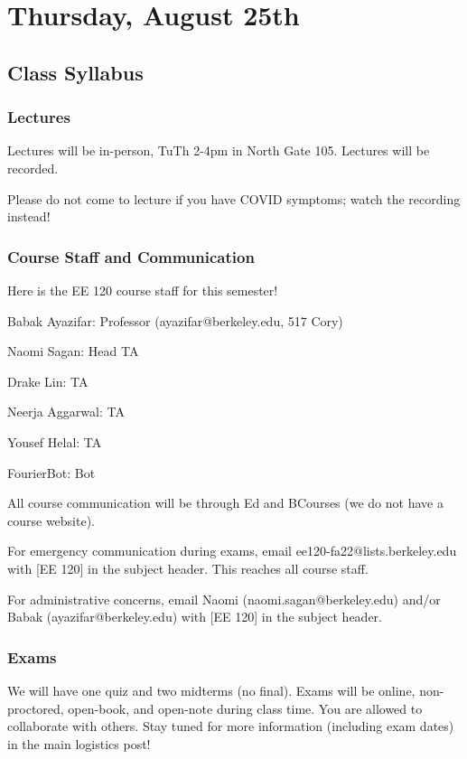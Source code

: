 \section{Thursday, August 25th}
\subsection{Class Syllabus}

\subsubsection{Lectures}
Lectures will be in-person, TuTh 2-4pm in North Gate 105. Lectures will be recorded.

Please do not come to lecture if you have COVID symptoms; watch the recording instead!

\subsubsection{Course Staff and Communication}

Here is the EE 120 course staff for this semester!

Babak Ayazifar: Professor (ayazifar@berkeley.edu, 517 Cory)

Naomi Sagan: Head TA

Drake Lin: TA

Neerja Aggarwal: TA

Yousef Helal: TA

FourierBot: Bot

All course communication will be through Ed and BCourses (we do not have a course website).

For emergency communication during exams, email ee120-fa22@lists.berkeley.edu with [EE 120] in the subject header. This reaches all course staff.

For administrative concerns, email Naomi (naomi.sagan@berkeley.edu) and/or Babak (ayazifar@berkeley.edu) with [EE 120] in the subject header.

\subsubsection{Exams}

We will have one quiz and two midterms (no final). Exams will be online, non-proctored, open-book, and open-note during class time. You are allowed to collaborate with others. Stay tuned for more information (including exam dates) in the main logistics post!

